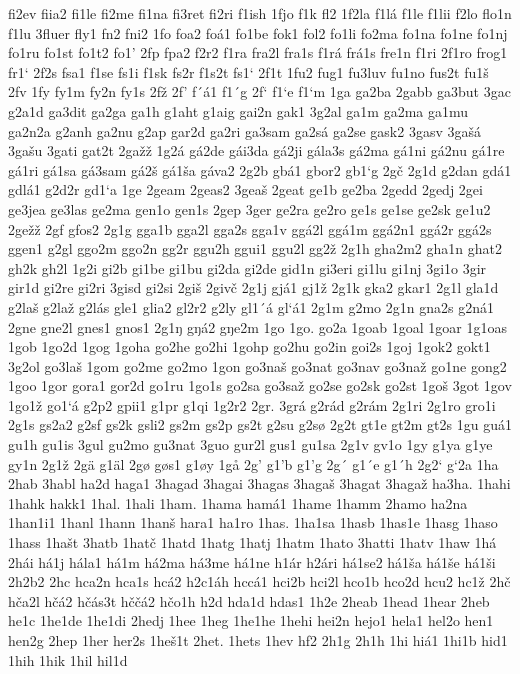 fi2ev
fiia2
fi1le
fi2me
fi1na
fi3ret
fi2ri
f1ish
1fjo
f1k
fl2
1f2la
f1lá
f1le
f1lii
f2lo
flo1n
f1lu
3fluer
fly1
fn2
fni2
1fo
foa2
foá1
fo1be
fok1
fol2
fo1li
fo2ma
fo1na
fo1ne
fo1nj
fo1ru
fo1st
fo1t2
fo1'
2fp
fpa2
f2r2
f1ra
fra2l
fra1s
f1rá
frá1s
fre1n
f1ri
2f1ro
frog1
fr1`
2f2s
fsa1
f1se
fs1i
f1sk
fs2r
f1s2t
fs1`
2f1t
1fu2
fug1
fu3luv
fu1no
fus2t
fu1š
2fv
1fy
fy1m
fy2n
fy1s
2fž
2f'
f´á1
f1´g
2f`
f1`e
f1`m
1ga
ga2ba
2gabb
ga3but
3gac
g2a1d
ga3dit
ga2ga
ga1h
g1aht
g1aig
gai2n
gak1
3g2al
ga1m
ga2ma
ga1mu
ga2n2a
g2anh
ga2nu
g2ap
gar2d
ga2ri
ga3sam
ga2sá
ga2se
gask2
3gasv
3gašá
3gašu
3gati
gat2t
2gažž
1g2á
gá2de
gái3da
gá2ji
gála3s
gá2ma
gá1ni
gá2nu
gá1re
gá1ri
gá1sa
gá3sam
gá2š
gá1ša
gáva2
2g2b
gbá1
gbor2
gb1`g
2gč
2g1d
g2dan
gdá1
gdlá1
g2d2r
gd1`a
1ge
2geam
2geas2
3geaš
2geat
ge1b
ge2ba
2gedd
2gedj
2gei
ge3jea
ge3las
ge2ma
gen1o
gen1s
2gep
3ger
ge2ra
ge2ro
ge1s
ge1se
ge2sk
ge1u2
2gežž
2gf
gfos2
2g1g
gga1b
gga2l
gga2s
gga1v
ggá2l
ggá1m
ggá2n1
ggá2r
ggá2s
ggen1
g2gl
ggo2m
ggo2n
gg2r
ggu2h
ggui1
ggu2l
gg2ž
2g1h
gha2m2
gha1n
ghat2
gh2k
gh2l
1g2i
gi2b
gi1be
gi1bu
gi2da
gi2de
gid1n
gi3eri
gi1lu
gi1nj
3gi1o
3gir
gir1d
gi2re
gi2ri
3gisd
gi2si
2giš
2givč
2g1j
gjá1
gj1ž
2g1k
gka2
gkar1
2g1l
gla1d
g2laš
g2laž
g2lás
gle1
glia2
gl2r2
g2ly
gl1´á
gl`á1
2g1m
g2mo
2g1n
gna2s
g2ná1
2gne
gne2l
gnes1
gnos1
2g1ŋ
gŋá2
gŋe2m
1go
1go.
go2a
1goab
1goal
1goar
1g1oas
1gob
1go2d
1gog
1goha
go2he
go2hi
1gohp
go2hu
go2in
goi2s
1goj
1gok2
gokt1
3g2ol
go3laš
1gom
go2me
go2mo
1gon
go3naš
go3nat
go3nav
go3naž
go1ne
gong2
1goo
1gor
gora1
gor2d
go1ru
1go1s
go2sa
go3saž
go2se
go2sk
go2st
1goš
3got
1gov
1go1ž
go1`á
g2p2
gpii1
g1pr
g1qi
1g2r2
2gr.
3grá
g2rád
g2rám
2g1ri
2g1ro
gro1i
2g1s
gs2a2
g2sf
gs2k
gsli2
gs2m
gs2p
gs2t
g2su
g2sø
2g2t
gt1e
gt2m
gt2s
1gu
guá1
gu1h
gu1is
3gul
gu2mo
gu3nat
3guo
gur2l
gus1
gu1sa
2g1v
gv1o
1gy
g1ya
g1ye
gy1n
2g1ž
2gä
g1äl
2gø
gøs1
g1øy
1gå
2g'
g1'b
g1'g
2g´
g1´e
g1´h
2g2`
g`2a
1ha
2hab
3habl
ha2d
haga1
3hagad
3hagai
3hagas
3hagaš
3hagat
3hagaž
ha3ha.
1hahi
1hahk
hakk1
1hal.
1hali
1ham.
1hama
hamá1
1hame
1hamm
2hamo
ha2na
1han1i1
1hanl
1hann
1hanš
hara1
ha1ro
1has.
1ha1sa
1hasb
1has1e
1hasg
1haso
1hass
1hašt
3hatb
1hatč
1hatd
1hatg
1hatj
1hatm
1hato
3hatti
1hatv
1haw
1há
2hái
há1j
hála1
há1m
há2ma
há3me
há1ne
h1ár
h2ári
há1se2
há1ša
há1še
há1ši
2h2b2
2hc
hca2n
hca1s
hcá2
h2c1áh
hccá1
hci2b
hci2l
hco1b
hco2d
hcu2
hc1ž
2hč
hča2l
hčá2
hčás3t
hččá2
hčo1h
h2d
hda1d
hdas1
1h2e
2heab
1head
1hear
2heb
he1c
1he1de
1he1di
2hedj
1hee
1heg
1he1he
1hehi
hei2n
hejo1
hela1
hel2o
hen1
hen2g
2hep
1her
her2s
1heš1t
2het.
1hets
1hev
hf2
2h1g
2h1h
1hi
hiá1
1hi1b
hid1
1hih
1hik
1hil
hil1d

